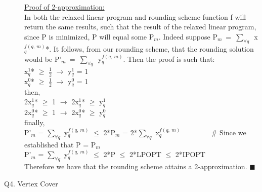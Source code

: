 \documentclass[10pt]{csc_assignment}
\begin{document}
\begin{description}
\underline{Proof of 2-approximation:}\\
In both the relaxed linear program and rounding scheme function f will return the same results, such that the result of the relaxed linear program, since P is minimized, P will equal some P$_{m}$. Indeed suppose \mbox{P$_{m}$ = $\sum_{\forall q}$ x$_{q}^{f(q,~ m)}$}*. It follows, from our rounding scheme, that the rounding solution would be \mbox{P'$_{m}$ = $\sum_{\forall q}$ y$_{q}^{f(q,~ m)}$}. Then the proof is such that:\\
x$_{q}^1$* $\geqslant$ $\frac{1}{2}$ $\rightarrow$ y$_{q}^1$ = 1\\
x$_{q}^0$* $\geqslant$ $\frac{1}{2}$ $\rightarrow$ y$_{q}^0$ = 1\\
then,\\
2x$_{q}^1$* $\geqslant$ 1 $\rightarrow$ 2x$_{q}^1$* $\geqslant$ y$_{q}^1$\\
2x$_{q}^0$* $\geqslant$ 1 $\rightarrow$ 2x$_{q}^0$* $\geqslant$ y$_{q}^0$\\
finally,\\
P'$_{m}$ = $\sum_{\forall q}$ y$_{q}^{f(q,~ m)}$ $\leqslant$
2*P$_{m}$ = 2*$\sum_{\forall q}$ x$_{q}^{f(q,~ m)}$ ~~~~~~~~\# Since we established that P = P$_{m}$\\
P'$_{m}$ = $\sum_{\forall q}$ y$_{q}^{f(q,~ m)}$ $\leqslant$ 2*P $\leqslant$  2*LPOPT $\leqslant$ 2*IPOPT\\
Therefore we have that the rounding scheme attains a 2-approximation. $\blacksquare$\\
 

\newpage
\item[Q4. Vertex Cover]


\end{description}
\end{document}
